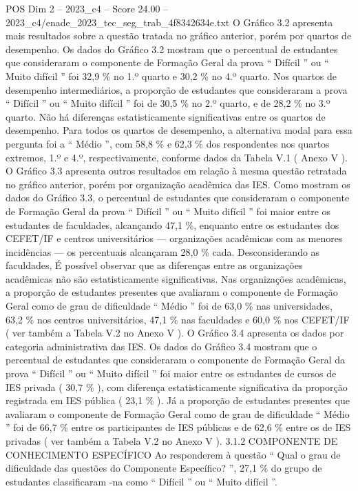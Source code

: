 \begin{textsample}{POS Dim 2 – 2023\_c4 – Score 24.00 – 2023\_c4/enade\_2023\_tec\_seg\_trab\_4f8342634e.txt}
O Gráfico 3.2 apresenta mais resultados sobre a questão tratada no gráfico anterior, porém por quartos de desempenho.
Os dados do Gráfico 3.2 mostram que o percentual de estudantes que consideraram o componente de Formação Geral da prova “ Difícil ” ou “ Muito difícil ” foi 32,9 \% no 1.º quarto e 30,2 \% no 4.º quarto.
Nos quartos de desempenho intermediários, a proporção de estudantes que consideraram a prova “ Difícil ” ou “ Muito difícil ” foi de 30,5 \% no 2.º quarto, e de 28,2 \% no 3.º quarto.
Não há diferenças estatisticamente significativas entre os quartos de desempenho.
Para todos os quartos de desempenho, a alternativa modal para essa pergunta foi a “ Médio ”, com 58,8 \% e 62,3 \% dos respondentes nos quartos extremos, 1.º e 4.º, respectivamente, conforme dados da Tabela V.1 ( Anexo V ).
O Gráfico 3.3 apresenta outros resultados em relação à mesma questão retratada no gráfico anterior, porém por organização acadêmica das IES.
Como mostram os dados do Gráfico 3.3, o percentual de estudantes que consideraram o componente de Formação Geral da prova “ Difícil ” ou “ Muito difícil ” foi maior entre os estudantes de faculdades, alcançando 47,1 \%, enquanto entre os estudantes dos CEFET/IF e centros universitários — organizações acadêmicas com as menores incidências — os percentuais alcançaram 28,0 \% cada.
Desconsiderando as faculdades, É possível observar que as diferenças entre as organizações acadêmicas não são estatisticamente significativas.
Nas organizações acadêmicas, a proporção de estudantes presentes que avaliaram o componente de Formação Geral como de grau de dificuldade “ Médio ” foi de 63,0 \% nas universidades, 63,2 \% nos centros universitários, 47,1 \% nas faculdades e 60,0 \% nos CEFET/IF ( ver também a Tabela V.2 no Anexo V ).
O Gráfico 3.4 apresenta os dados por categoria administrativa das IES.
Os dados do Gráfico 3.4 mostram que o percentual de estudantes que consideraram o componente de Formação Geral da prova “ Difícil ” ou “ Muito difícil ” foi maior entre os estudantes de cursos de IES privada ( 30,7 \% ), com diferença estatisticamente significativa da proporção registrada em IES pública ( 23,1 \% ).
Já a proporção de estudantes presentes que avaliaram o componente de Formação Geral como de grau de dificuldade “ Médio ” foi de 66,7 \% entre os participantes de IES públicas e de 62,6 \% entre os de IES privadas ( ver também a Tabela V.2 no Anexo V ). 3.1.2 COMPONENTE DE CONHECIMENTO ESPECÍFICO Ao responderem à questão “ Qual o grau de dificuldade das questões do Componente Específico? ”, 27,1 \% do grupo de estudantes classificaram -na como “ Difícil ” ou “ Muito difícil ”.

\end{textsample}
